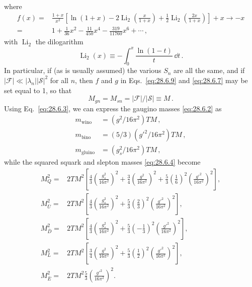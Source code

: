 where
\begin{equation}
  \begin{aligned}
    f(x)={}&\frac{1+x}{x^2}
    \left[
      \ln(1+x)
      -2\operatorname{Li}_2\left(\frac{x}{1+x}\right)
      +\frac{1}{2}\operatorname{Li}_2\left(\frac{2x}{1+x}\right)
    \right]
    +x\longrightarrow -x\\
    ={}&1+\frac{1}{36}x^2-\frac{11}{450}x^4
      -\frac{319}{11760}x^6+\cdots\,,
  \end{aligned}
  \tag{28.6.10}\label{eq:28.6.10}
\end{equation}
with \(\operatorname{Li}_2\) the dilogarithm
\begin{equation}
  \operatorname{Li}_2(x)\equiv-\int_0^x\frac{\ln(1-t)}{t}\,\dd t\,.
  \tag{28.6.11}\label{eq:28.6.11}
\end{equation}
In particular, if (as is usually assumed) the various \(S_n\) are all the
same, and if
\(\lvert\mathcal{F}\rvert\ll
\lvert\lambda_n\rvert\lvert\mathcal{S}\rvert^2\) for all \(n\), then
\(f\) and \(g\) in Eqs.~\eqref{eq:28.6.9} and \eqref{eq:28.6.7} may be
set equal to 1, so that
\begin{equation}
  M_{gn}=M_{sn}
  =\lvert\mathcal{F}\rvert/\lvert\mathcal{S}\rvert\equiv M\,.
  \tag{28.6.12}\label{eq:28.6.12}
\end{equation}
Using Eq.~\eqref{eq:28.6.3}, we can express the gaugino masses
\eqref{eq:28.6.2} as
\begin{equation}
  \begin{aligned}
    m_{\mathrm{wino}}&=(g^2/16\pi^2)TM\,,\\
    m_{\mathrm{bino}}&=(5/3)(g'^2/16\pi^2)TM\,,\\
    m_{\mathrm{gluino}}&=(g_s^2/16\pi^2)TM\,,
  \end{aligned}
  \tag{28.6.13}\label{eq:28.6.13}
\end{equation}
while the squared squark and slepton masses \eqref{eq:28.6.4} become
\begin{equation}
  \begin{aligned}
    M_Q^2={}&2TM^2
      \left[
        \frac{4}{3}\left(\frac{g_s^2}{16\pi^2}\right)^2
        +\frac{3}{4}\left(\frac{g^2}{16\pi^2}\right)^2
        +\frac{5}{3}\left(\frac{1}{6}\right)^2
          \left(\frac{g'^2}{16\pi^2}\right)^2
      \right],\\
    M_{\bar U}^2={}&2TM^2
      \left[
        \frac{4}{3}\left(\frac{g_s^2}{16\pi^2}\right)^2
        +\frac{5}{3}\left(\frac{2}{3}\right)^2
          \left(\frac{g'^2}{16\pi^2}\right)^2
      \right],\\
    M_{\bar D}^2={}&2TM^2
      \left[
        \frac{4}{3}\left(\frac{g_s^2}{16\pi^2}\right)^2
        +\frac{5}{3}\left(-\frac{1}{3}\right)^2
          \left(\frac{g'^2}{16\pi^2}\right)^2
      \right],\\
    M_L^2={}&2TM^2
      \left[
        \frac{3}{4}\left(\frac{g^2}{16\pi^2}\right)^2
        +\frac{5}{3}\left(\frac{1}{2}\right)^2
          \left(\frac{g'^2}{16\pi^2}\right)^2
      \right],\\
    M_{\bar E}^2={}&2TM^2\frac{5}{3}
      \left(\frac{g'^2}{16\pi^2}\right)^2 .
  \end{aligned}
  \tag{28.6.14}\label{eq:28.6.14}
\end{equation}

